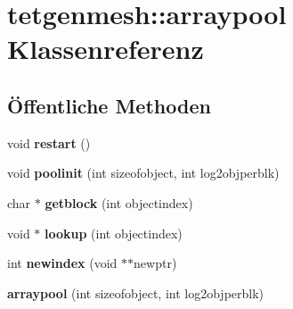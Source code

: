 \hypertarget{classtetgenmesh_1_1arraypool}{\section{tetgenmesh\-:\-:arraypool Klassenreferenz}
\label{classtetgenmesh_1_1arraypool}
}
\subsection*{Öffentliche Methoden}
\begin{DoxyCompactItemize}
\item 
\hypertarget{classtetgenmesh_1_1arraypool_a19030126ef81a9ff3c4aca35f0347cdc}{void {\bfseries restart} ()}\label{classtetgenmesh_1_1arraypool_a19030126ef81a9ff3c4aca35f0347cdc}

\item 
\hypertarget{classtetgenmesh_1_1arraypool_a3069be62301a28c1e89201008e838cf8}{void {\bfseries poolinit} (int sizeofobject, int log2objperblk)}\label{classtetgenmesh_1_1arraypool_a3069be62301a28c1e89201008e838cf8}

\item 
\hypertarget{classtetgenmesh_1_1arraypool_a3389d606b99e572c2d381fa51bc3793b}{char $\ast$ {\bfseries getblock} (int objectindex)}\label{classtetgenmesh_1_1arraypool_a3389d606b99e572c2d381fa51bc3793b}

\item 
\hypertarget{classtetgenmesh_1_1arraypool_af7ead1b15097f61c7082568ce1121f05}{void $\ast$ {\bfseries lookup} (int objectindex)}\label{classtetgenmesh_1_1arraypool_af7ead1b15097f61c7082568ce1121f05}

\item 
\hypertarget{classtetgenmesh_1_1arraypool_afb546c70f7728e3e0d58e2aada464437}{int {\bfseries newindex} (void $\ast$$\ast$newptr)}\label{classtetgenmesh_1_1arraypool_afb546c70f7728e3e0d58e2aada464437}

\item 
\hypertarget{classtetgenmesh_1_1arraypool_a62a21b86eafefd79c951e85a9b180d0f}{{\bfseries arraypool} (int sizeofobject, int log2objperblk)}\label{classtetgenmesh_1_1arraypool_a62a21b86eafefd79c951e85a9b180d0f}

\end{DoxyCompactItemize}
